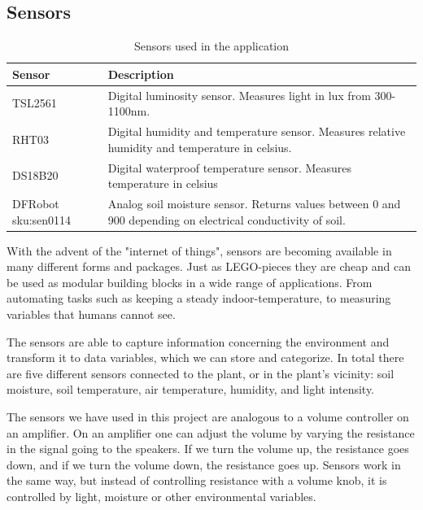 \subsection{Sensors}

\def\arraystretch{1.8}
\begin{table}
	\begin{tabular}{@{}lp{250pt}@{}}\toprule
	Sensor               & Description \\ \midrule                                                                                                  
	TSL2561              & Digital luminosity sensor. Measures light in lux from 300-1100nm.                                            \\ 
	RHT03                & Digital humidity and temperature sensor. Measures relative humidity and temperature in celsius.              \\ 
	DS18B20              & Digital waterproof temperature sensor. Measures temperature in celsius                                       \\ 
	DFRobot sku:sen0114  & Analog soil moisture sensor. Returns values between 0 and 900 depending on electrical conductivity of soil.  \\ \bottomrule
	\end{tabular}
	\caption{Sensors used in the application}
\end{table}


With the advent of the "internet of things", sensors are becoming available in many different forms and packages. Just as LEGO-pieces they are cheap and can be used as modular building blocks in a wide range of applications. From automating tasks such as keeping a steady indoor-temperature, to measuring variables that humans cannot see. 

The sensors are able to capture information concerning the environment and transform it to data variables, which we can store and categorize. In total there are five different sensors connected to the plant, or in the plant’s vicinity: soil moisture, soil temperature, air temperature, humidity, and light intensity. 



The sensors we have used in this project are analogous to a volume controller on an amplifier. On an amplifier one can adjust the volume by varying the resistance in the signal going to the speakers. If we turn the volume up, the resistance goes down, and if we turn the volume down, the resistance goes up. Sensors work in the same way, but instead of controlling resistance with a volume knob, it is controlled by light, moisture or other environmental variables. 

